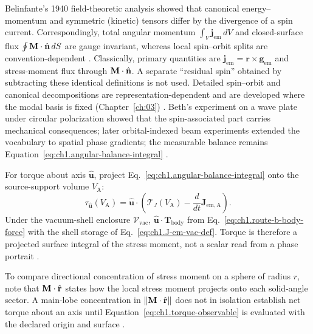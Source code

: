 Belinfante's 1940 field-theoretic analysis \cite{belinfante1940} showed that canonical
energy--momentum and symmetric (kinetic) tensors differ by the divergence of a spin
current. Correspondingly, total angular momentum
$\int_V \mathbf{j}_{\mathrm{em}}\,dV$ and closed-surface flux
$\oint \mathbf{M}\cdot\hat{\mathbf{n}}\,dS$ are gauge invariant, whereas local spin--orbit splits are convention-dependent \cite{belinfante1940}. Classically, primary quantities are $\mathbf{j}_{\mathrm{em}}=\mathbf{r}\times\mathbf{g}_{\mathrm{em}}$ and stress-moment flux through $\mathbf{M}\cdot\hat{\mathbf{n}}$. A separate
``residual spin'' obtained by subtracting these identical definitions is not used.
Detailed spin--orbit and canonical decompositions are representation-dependent and are
developed where the modal basis is fixed (Chapter~\ref{ch:03}) \cite{belinfante1940,tai1994}.
Beth's experiment on a wave plate under circular polarization
\cite{beth1936} showed that the spin-associated part carries mechanical consequences; later orbital-indexed beam experiments
\cite{allen1992} extended the vocabulary to spatial phase gradients; the measurable
balance remains Equation~\eqref{eq:ch1.angular-balance-integral} \cite{belinfante1940}.

For torque about axis $\hat{\mathbf{u}}$, project Eq.~\eqref{eq:ch1.angular-balance-integral} onto the source-support volume $V_{\mathrm{A}}$:
\begin{equation}
\label{eq:ch1.torque-observable}
\tau_{\hat{\mathbf{u}}}(V_{\mathrm{A}})
=\hat{\mathbf{u}}\cdot
\left(
\boldsymbol{\mathcal{T}}_J(V_{\mathrm{A}})-\frac{d}{dt}\mathbf{J}_{\mathrm{em,A}}
\right).
\end{equation}
Under the vacuum-shell enclosure $\mathcal{V}_{\mathrm{vac}}$, $\hat{\mathbf{u}}\cdot\mathbf{T}_{\mathrm{body}}$ from Eq.~\eqref{eq:ch1.route-b-body-force} with the shell storage of Eq.~\eqref{eq:ch1.J-em-vac-def}.
Torque is therefore a projected surface integral of the stress moment, not a scalar read from a phase portrait \cite{beth1936,stratton1941}.

To compare directional concentration of stress moment on a sphere of radius $r$, note that $\mathbf{M}\cdot\hat{\mathbf{r}}$ states how the local stress moment projects onto each solid-angle sector. A main-lobe concentration in $\|\mathbf{M}\cdot\hat{\mathbf{r}}\|$ does not in isolation establish net torque about an axis until Equation~\eqref{eq:ch1.torque-observable} is evaluated with the declared origin and surface \cite{stratton1941,beth1936}.
\label{eq:ch1.angular-flux-directional-index}

